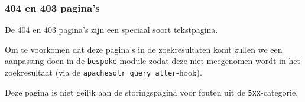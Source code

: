 \subsubsection{404 en 403 pagina's}\label{404pagina}

De 404 en 403 pagina's zijn een speciaal soort tekstpagina.

Om te voorkomen dat deze pagina's in de zoekresultaten komt zullen we een aanpassing doen in de \texttt{bespoke} module zodat deze niet meegenomen wordt in het zoekresultaat (via de \texttt{apachesolr\_query\_alter}-hook).

Deze pagina is niet geiljk aan de storingspagina voor fouten uit de \texttt{5xx}-categorie.

